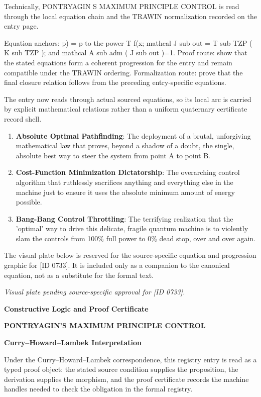 Technically, PONTRYAGIN S MAXIMUM PRINCIPLE CONTROL is read through the local equation chain and the TRAWIN normalization recorded on the entry page.

Equation anchors: p) = p to the power T f(x; mathcal J sub out = T sub TZP ( K sub TZP ); and mathcal A sub adm ( J sub out )=1. Proof route: show that the stated equations form a coherent progression for the entry and remain compatible under the TRAWIN ordering. Formalization route: prove that the final closure relation follows from the preceding entry-specific equations.

The entry now reads through actual sourced equations, so its local arc is carried by explicit mathematical relations rather than a uniform quaternary certificate record shell.
\endgroup

\begin{enumerate}[leftmargin=1.6em,itemsep=6pt,topsep=4pt]
\item \textbf{Absolute Optimal Pathfinding}: The deployment of a brutal, unforgiving mathematical law that proves, beyond a shadow of a doubt, the single, absolute best way to steer the system from point A to point B.
\item \textbf{Cost-Function Minimization Dictatorship}: The overarching control algorithm that ruthlessly sacrifices anything and everything else in the machine just to ensure it uses the absolute minimum amount of energy possible.
\item \textbf{Bang-Bang Control Throttling}: The terrifying realization that the 'optimal' way to drive this delicate, fragile quantum machine is to violently slam the controls from 100\% full power to 0\% dead stop, over and over again.
\end{enumerate}

\begingroup\footnotesize\sloppy
The visual plate below is reserved for the source-specific equation and progression graphic for [ID 0733]. It is included only as a companion to the canonical equation, not as a substitute for the formal text.
\par\endgroup
\begingroup\footnotesize\itshape
Visual plate pending source-specific approval for [ID 0733].
\par\endgroup

\clearpage
\begingroup\tzpsupportsetup
\noindent\textbf{\fontsize{10.8pt}{12.8pt}\selectfont [ID 0733] Constructive Logic and Proof Certificate}\par
\noindent\textbf{\fontsize{10pt}{12pt}\selectfont PONTRYAGIN'S MAXIMUM PRINCIPLE CONTROL}\par
\vspace{0.45em}
\begingroup
\footnotesize
\setlength{\parskip}{0.22em}
\setlength{\parindent}{0pt}
\noindent\textbf{Curry--Howard--Lambek Interpretation}\par
Under the Curry--Howard--Lambek correspondence, this registry entry is read as a typed proof
object: the stated source condition supplies the proposition, the derivation supplies the
morphism, and the proof certificate records the machine handles needed to check the obligation
in the formal registry.

